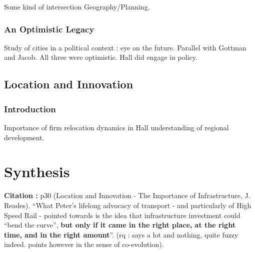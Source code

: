 Some kind of intersection Geography/Planning.

\subsubsection{An Optimistic Legacy}

Study of cities in a political context : eye on the future. Parallel with Gottman and Jacob. All three were optimistic. Hall did engage in policy.


\subsection{Location and Innovation}

\subsubsection{Introduction}

Importance of firm relocation dynamics in Hall understanding of regional development.




\section{Synthesis}


\textbf{Citation : } p30 (Location and Innovation - The Importance of Infrastructure, J. Reades). ``What Peter's lifelong advocacy of transport - and particularly of High Speed Rail - pointed towards is the idea that infrastructure investment could ``bend the curve'', \textbf{but only if it came in the right place, at the right time, and in the right amount}''. (rq : says a lot and nothing, quite fuzzy indeed. points however in the sense of co-evolution).















